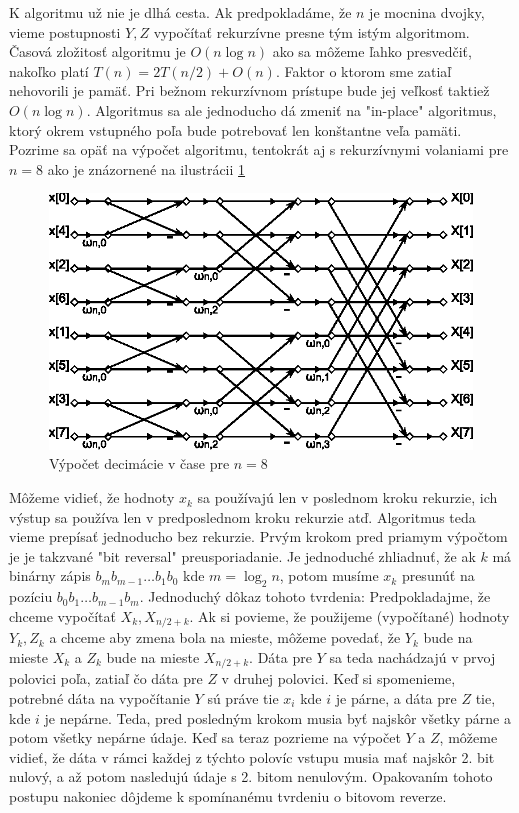 K algoritmu už nie je dlhá cesta. Ak predpokladáme, že $n$ je mocnina
dvojky, vieme postupnosti $Y,Z$ vypočítať rekurzívne presne tým istým
algoritmom. Časová zložitosť algoritmu je $O(n\log n)$ ako sa môžeme
ľahko presvedčiť, nakoľko platí $T(n) = 2 T(n/2) + O(n)$.
Faktor o ktorom sme zatiaľ nehovorili je pamäť. Pri bežnom rekurzívnom
prístupe bude jej veľkosť taktiež $O(n \log n)$. Algoritmus sa ale
jednoducho dá zmeniť na "in-place" algoritmus, ktorý okrem vstupného
poľa bude potrebovať len konštantne veľa pamäti. Pozrime sa opäť na
výpočet algoritmu, tentokrát aj s rekurzívnymi volaniami pre $n=8$ ako
je znázornené na ilustrácii \ref{fig:dit}

\begin{figure}[htp]
    \centering
        \includegraphics{obrazky/algoritmy/dit}
        \caption{Výpočet decimácie v čase pre $n=8$}
    \label{fig:dit}
\end{figure}

Môžeme vidieť, že hodnoty $x_k$ sa používajú len v poslednom kroku
rekurzie, ich výstup sa používa len v predposlednom kroku rekurzie
atď. Algoritmus teda vieme prepísať jednoducho bez rekurzie.
Prvým krokom pred priamym výpočtom je je takzvané "bit reversal"
preusporiadanie. Je jednoduché zhliadnuť, že ak $k$ má binárny zápis
$b_m b_{m-1} \dots b_1 b_0$ kde $m = \log_2 n$, potom musíme
$x_k$ presunúť na pozíciu $b_0 b_1 \dots b_{m-1} b_m$. Jednoduchý
dôkaz tohoto tvrdenia: 
Predpokladajme, že chceme vypočítať $X_k, X_{n/2+k}$. Ak si povieme,
že použijeme (vypočítané) hodnoty $Y_k, Z_k$ a chceme aby zmena bola
na mieste, môžeme povedať, že $Y_k$ bude na mieste $X_k$ a $Z_k$ bude
na mieste $X_{n/2+k}$. Dáta pre $Y$ sa teda nachádzajú v prvoj
polovici poľa, zatiaľ čo dáta pre $Z$ v druhej polovici.
Keď si spomenieme, potrebné dáta na vypočítanie $Y$ sú práve tie $x_i$ kde $i$ je párne,
a dáta pre $Z$ tie, kde $i$ je nepárne. Teda, pred posledným krokom
musia byť najskôr všetky párne a potom všetky nepárne údaje. Keď sa
teraz pozrieme na výpočet $Y$ a $Z$, môžeme vidieť, že dáta v rámci
každej z týchto polovíc vstupu musia mať najskôr 2. bit nulový, a až
potom nasledujú údaje s 2. bitom nenulovým. Opakovaním tohoto postupu
nakoniec dôjdeme k spomínanému tvrdeniu o bitovom reverze.



